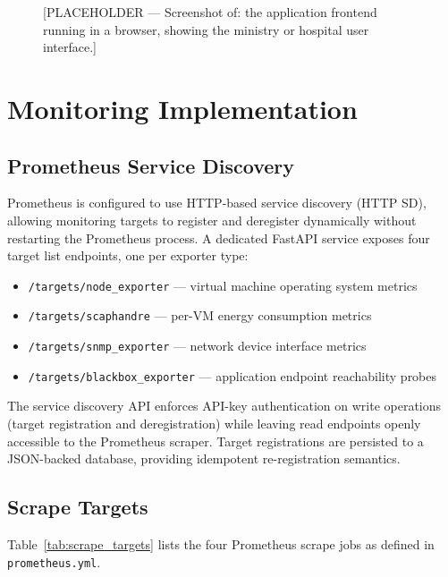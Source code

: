 \documentclass[12pt,a4paper]{report}
\begin{document}
\begin{figure}[htbp]
\centering
\fbox{\rule{0pt}{4cm}\rule{0.9\linewidth}{0pt}}
\caption{[PLACEHOLDER --- Screenshot of: the application frontend running in a
browser, showing the ministry or hospital user interface.]}
\label{fig:placeholder_app_browser}
\end{figure}

\section{Monitoring Implementation}

\subsection{Prometheus Service Discovery}

Prometheus is configured to use HTTP-based service discovery (HTTP SD), allowing
monitoring targets to register and deregister dynamically without restarting the
Prometheus process. A dedicated FastAPI service exposes four target list endpoints,
one per exporter type:

\begin{itemize}
  \item \texttt{/targets/node\_exporter} --- virtual machine operating system metrics
  \item \texttt{/targets/scaphandre} --- per-VM energy consumption metrics
  \item \texttt{/targets/snmp\_exporter} --- network device interface metrics
  \item \texttt{/targets/blackbox\_exporter} --- application endpoint reachability probes
\end{itemize}

The service discovery API enforces API-key authentication on write operations
(target registration and deregistration) while leaving read endpoints openly
accessible to the Prometheus scraper. Target registrations are persisted to a
JSON-backed database, providing idempotent re-registration semantics.

\subsection{Scrape Targets}

Table~\ref{tab:scrape_targets} lists the four Prometheus scrape jobs as defined in
\texttt{prometheus.yml}.
\end{document}
